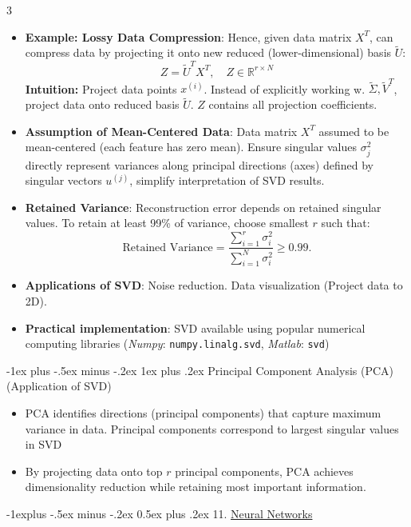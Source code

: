 \documentclass[a4paper, 9pt, landscape]{article}
\makeatletter
\renewcommand{\subsection}{\@startsection{subsection}{2}{0mm}%
                                {-1explus -.5ex minus -.2ex}%
                                {0.5ex plus .2ex}%
                                {\normalfont\normalsize\bfseries}}
\renewcommand{\subsubsection}{\@startsection{subsubsection}{3}{0mm}%
                                {-1ex plus -.5ex minus -.2ex}%
                                {1ex plus .2ex}%
                                {\normalfont\small\bfseries}}
\makeatother
\begin{document}
\begin{multicols*}{3}
\begin{itemize}[itemsep=-1pt]
\item \textbf{Example: Lossy Data Compression}: Hence, given data matrix $ X^T $, can compress data by projecting it onto new reduced (lower-dimensional) basis $\tilde{U}$:
\[Z = \tilde{U}^T X^T, \quad Z \in \mathbb{R}^{r \times N} \]
\textbf{Intuition:} Project data points $x^{(i)}$. Instead of explicitly working w. $\tilde{\Sigma}, \tilde{V}^T$, project data onto reduced basis $\tilde{U}$. $ Z$ contains all projection coefficients.

\item \textbf{Assumption of Mean-Centered Data}: Data matrix $ X^T $ assumed to be mean-centered (each feature has zero mean). Ensure singular values $ \sigma_j^2 $ directly represent variances along principal directions (axes) defined by singular vectors $ u^{(j)} $, simplify interpretation of SVD results.

\item \textbf{Retained Variance}: Reconstruction error depends on retained singular values. To retain at least 99\% of variance, choose smallest $ r $ such that:
\[\text{Retained Variance} = \frac{\sum_{i=1}^r \sigma_i^2}{\sum_{i=1}^N \sigma_i^2} \geq 0.99.\]

\item \textbf{Applications of SVD}: Noise reduction. Data visualization (Project data to 2D).

\item \textbf{Practical implementation}: SVD available using popular numerical computing libraries (\textit{Numpy}: \texttt{numpy.linalg.svd}, \textit{Matlab}: \texttt{svd})
\end{itemize}

\subsubsection{Principal Component Analysis (PCA) {\scriptsize (Application of SVD)}}
\begin{itemize}
\item PCA identifies directions (principal components) that capture maximum variance in data. Principal components correspond to largest singular values in SVD
\item By projecting data onto top $ r $ principal components, PCA achieves dimensionality reduction while retaining most important information.
\end{itemize}


\columnbreak


\subsection{11. \underline{Neural Networks}}


\end{multicols*}
\end{document}
